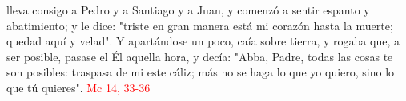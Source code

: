 lleva consigo a Pedro y a Santiago y a Juan, y comenzó a sentir espanto y abatimiento; y le dice: "triste en gran manera está mi corazón hasta la muerte;
quedad aquí y velad". Y apartándose un poco, caía sobre tierra, y rogaba que, a ser posible, pasase el Él aquella hora, y decía: "Abba, Padre, todas las cosas te son posibles:
traspasa de mi este cáliz; más no se haga lo que yo quiero, sino lo que tú quieres". \textcolor{red}{Mc 14, 33-36}